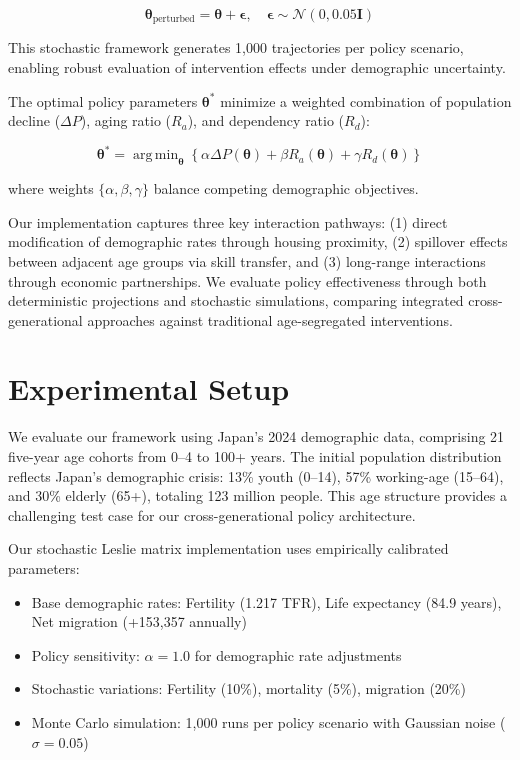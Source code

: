 \documentclass{article} %
\DeclareMathOperator*{\argmin}{arg\,min}
\begin{document}
\begin{equation}
\boldsymbol{\theta}_{\text{perturbed}} = \boldsymbol{\theta} + \boldsymbol{\epsilon}, \quad \boldsymbol{\epsilon} \sim \mathcal{N}(0, 0.05\mathbf{I})
\end{equation}

This stochastic framework generates 1,000 trajectories per policy scenario, enabling robust evaluation of intervention effects under demographic uncertainty.

The optimal policy parameters $\boldsymbol{\theta}^*$ minimize a weighted combination of population decline ($\Delta P$), aging ratio ($R_a$), and dependency ratio ($R_d$):

\begin{equation}
\boldsymbol{\theta}^* = \argmin_{\boldsymbol{\theta}} \left\{ \alpha\Delta P(\boldsymbol{\theta}) + \beta R_a(\boldsymbol{\theta}) + \gamma R_d(\boldsymbol{\theta}) \right\}
\end{equation}

where weights $\{\alpha, \beta, \gamma\}$ balance competing demographic objectives.

Our implementation captures three key interaction pathways: (1) direct modification of demographic rates through housing proximity, (2) spillover effects between adjacent age groups via skill transfer, and (3) long-range interactions through economic partnerships. We evaluate policy effectiveness through both deterministic projections and stochastic simulations, comparing integrated cross-generational approaches against traditional age-segregated interventions.

\section{Experimental Setup}
\label{sec:experimental}

We evaluate our framework using Japan's 2024 demographic data, comprising 21 five-year age cohorts from 0--4 to 100+ years. The initial population distribution reflects Japan's demographic crisis: 13\% youth (0--14), 57\% working-age (15--64), and 30\% elderly (65+), totaling 123 million people. This age structure provides a challenging test case for our cross-generational policy architecture.

Our stochastic Leslie matrix implementation uses empirically calibrated parameters:
\begin{itemize}
    \item Base demographic rates: Fertility (1.217 TFR), Life expectancy (84.9 years), Net migration (+153,357 annually)
    \item Policy sensitivity: $\alpha = 1.0$ for demographic rate adjustments
    \item Stochastic variations: Fertility (10\%), mortality (5\%), migration (20\%)
    \item Monte Carlo simulation: 1,000 runs per policy scenario with Gaussian noise ($\sigma = 0.05$)
\end{itemize}
\end{document}
